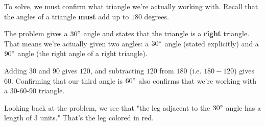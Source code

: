 \begin{solution}
    To solve, we must confirm what triangle we're actually working with. Recall that the angles of a triangle \textbf{must} add up to $180$ degrees. 
    
    The problem gives a $30\degree$ angle and states that the triangle is a \textbf{right} triangle. That means we're actually given two angles: a $30\degree$ angle (stated explicitly) and a $90\degree$ angle (the right angle of a right triangle).

    Adding $30$ and $90$ gives $120$, and subtracting $120$ from $180$ (i.e. $180 - 120$) gives $60$. Confirming that our third angle is $60\degree$ also confirms that we're working with a 30-60-90 triangle.

    Looking back at the problem, we see that "the leg adjacent to the $30\degree$ angle has a length of $3$ units." That's the leg colored in red.
    \begin{center}
        \begin{minipage}[c]{0.45\linewidth}
            \centering
\end{minipage}
\end{center}
\end{solution}
